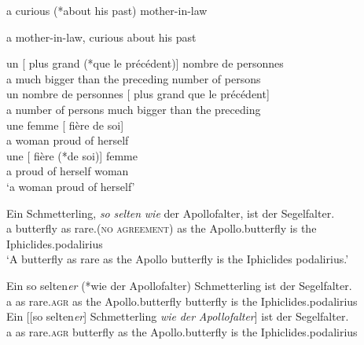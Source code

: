 \documentclass[output=paper
  ,nobabel
  ,uniformtopskip %
]{langscibook}
\begin{document}
\eal\label{ex-complexattributes}
\ex\label{ex-motherinlaw}  a curious (*about his past) mother-in-law

\ex a mother-in-law, curious about his past

\ex
\gll un [ plus grand (*que le précédent)] nombre de personnes \\
     a  {}        much bigger \hphantom{(*}than the preceding number of persons \\

\ex
\gll un nombre de personnes [ plus grand que le précédent] \\
     a  number of persons   {}        much bigger than the preceding \\

\ex
\gll une femme [ fière de soi] \\
     a   woman {}        proud of herself \\

\ex  
\gll une [ fière (*de soi)] femme  \\
     a   {}        proud \hphantom{(*}of herself woman \\
\glt `a woman proud of herself'

\zl


\eal\label{ex-schmetterling}
\ex\label{ex-schmetterling-a}
\gll Ein Schmetterling, \emph{so} \emph{selten} \emph{wie} der Apollofalter, ist der Segelfalter. \\
a butterfly as rare\textsc{.(no agreement)} as the Apollo.butterfly is the Iphiclides.podalirius \\
\glt `A butterfly as rare as the Apollo butterfly is the Iphiclides podalirius.'

\ex\label{ex-apollofalter}
\gll Ein so selten\emph{er} (*wie der Apollofalter) Schmetterling ist der Segelfalter. \\ 
     a as rare\textsc{.agr} \hphantom{(*}as the Apollo.butterfly butterfly is the Iphiclides.podalirius  \\

\ex \label{ex-segelfalter}
\gll Ein [[so selten\emph{er}] Schmetterling \emph{wie} \emph{der} \emph{Apollofalter}] ist der Segelfalter. \\
     a \hphantom{[[}as rare\textsc{.agr} butterfly as the Apollo.butterfly is the Iphiclides.podalirius \\
\zl
\end{document}
